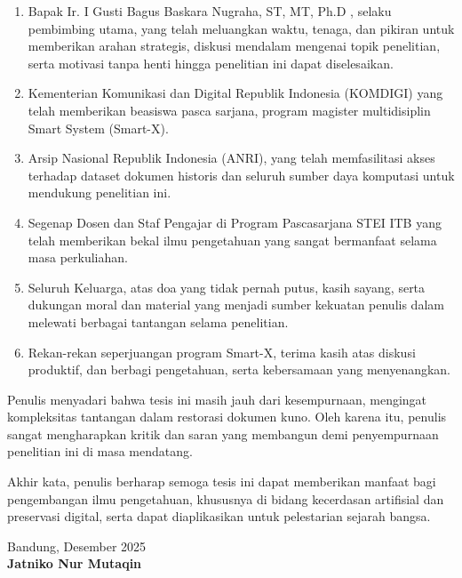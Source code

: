 \begin{enumerate}[leftmargin=1.5em, labelsep=0.5em, itemindent=0pt, noitemsep, topsep=0pt]
    \item Bapak Ir. I Gusti Bagus Baskara Nugraha, ST, MT, Ph.D , selaku pembimbing utama, yang telah meluangkan waktu, tenaga, dan pikiran untuk memberikan arahan strategis, diskusi mendalam mengenai topik penelitian, serta motivasi tanpa henti hingga penelitian ini dapat diselesaikan.

    \item Kementerian Komunikasi dan Digital Republik Indonesia (KOMDIGI) yang telah memberikan beasiswa pasca sarjana, program magister multidisiplin Smart System (Smart-X). 
        
    \item Arsip Nasional Republik Indonesia (ANRI), yang telah memfasilitasi akses terhadap dataset dokumen historis dan seluruh sumber daya komputasi untuk mendukung penelitian ini.
    
    \item Segenap Dosen dan Staf Pengajar di Program Pascasarjana STEI ITB yang telah memberikan bekal ilmu pengetahuan yang sangat bermanfaat selama masa perkuliahan.
    
    \item Seluruh Keluarga, atas doa yang tidak pernah putus, kasih sayang, serta dukungan moral dan material yang menjadi sumber kekuatan penulis dalam melewati berbagai tantangan selama penelitian.
    
    \item Rekan-rekan seperjuangan program Smart-X, terima kasih atas diskusi produktif, dan berbagi pengetahuan, serta kebersamaan yang menyenangkan.
\end{enumerate}

Penulis menyadari bahwa tesis ini masih jauh dari kesempurnaan, mengingat kompleksitas tantangan dalam restorasi dokumen kuno. Oleh karena itu, penulis sangat mengharapkan kritik dan saran yang membangun demi penyempurnaan penelitian ini di masa mendatang.

Akhir kata, penulis berharap semoga tesis ini dapat memberikan manfaat bagi pengembangan ilmu pengetahuan, khususnya di bidang kecerdasan artifisial dan preservasi digital, serta dapat diaplikasikan untuk pelestarian sejarah bangsa.

\vspace{2cm}

\begin{flushright}
    Bandung,   Desember 2025 \\
    \vspace{2cm}
    \textbf{Jatniko Nur Mutaqin}
\end{flushright}


